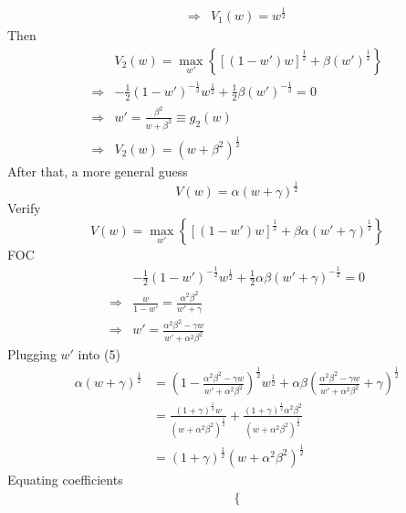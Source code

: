 \documentclass{article}
\begin{document}
\begin{enumerate}
\begin{enumerate}
\begin{align*}
                \Rightarrow &V_1(w)=w^\frac{1}{2}
            \end{align*}
            Then
            \begin{align*}
                &V_2(w)=\max_{w'}\left\{[(1-w')w]^\frac{1}{2}+\beta(w')^\frac{1}{2}\right\}\\
                \Rightarrow &-\frac{1}{2}(1-w')^{-\frac{1}{2}}w^\frac{1}{2}+\frac{1}{2}\beta(w')^{-\frac{1}{2}}=0\\
                \Rightarrow &w'=\frac{\beta^2}{w+\beta^2}\equiv g_2(w)\\
                \Rightarrow &V_2(w)=(w+\beta^2)^\frac{1}{2}
            \end{align*}
            After that, a more general guess
            \begin{equation*}
                V(w)=\alpha(w+\gamma)^\frac{1}{2}
            \end{equation*}
            Verify
            \begin{equation}
                V(w)=\max_{w'}\left\{[(1-w')w]^\frac{1}{2}+\beta\alpha(w'+\gamma)^\frac{1}{2}\right\}
            \end{equation}
            FOC
            \begin{align*}
                &-\frac{1}{2}(1-w')^{-\frac{1}{2}}w^\frac{1}{2}+\frac{1}{2}\alpha\beta(w'+\gamma)^{-\frac{1}{2}}=0\\
                \Rightarrow&\frac{w}{1-w'}=\frac{\alpha^2\beta^2}{w'+\gamma}\\
                \Rightarrow&w'=\frac{\alpha^2\beta^2-\gamma w}{w'+\alpha^2\beta^2}
            \end{align*}
            Plugging $w'$ into (5)
            \begin{align*}
                \alpha(w+\gamma)^\frac{1}{2}&=\left(1-\frac{\alpha^2\beta^2-\gamma w}{w'+\alpha^2\beta^2}\right)^\frac{1}{2}w^\frac{1}{2}+\alpha\beta\left(\frac{\alpha^2\beta^2-\gamma w}{w'+\alpha^2\beta^2}+\gamma\right)^\frac{1}{2}\\
                &=\frac{(1+\gamma)^\frac{1}{2}w}{(w+\alpha^2\beta^2)^\frac{1}{2}}+\frac{(1+\gamma)^\frac{1}{2}\alpha^2\beta^2}{(w+\alpha^2\beta^2)^\frac{1}{2}}\\
                &=(1+\gamma)^\frac{1}{2}(w+\alpha^2\beta^2)^\frac{1}{2}
            \end{align*}
            Equating coefficients
            \begin{align*}
                &\left\{\begin{aligned}

\end{aligned}
\end{align*}
\end{enumerate}
\end{enumerate}
\end{document}
